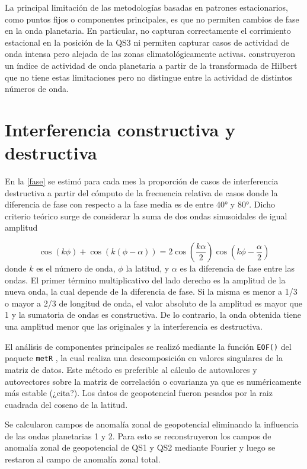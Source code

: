 \documentclass[spanish,a4paper,12pt,oneside]{book}
\begin{document}
La principal limitación de las metodologías basadas en patrones
estacionarios, como puntos fijos o componentes principales, es que no
permiten cambios de fase en la onda planetaria. En particular, no
capturan correctamente el corrimiento estacional en la posición de la
QS3 \autocite{Loon1972} ni permiten capturar casos de actividad de onda
intensa pero alejada de las zonas climatológicamente activas.
\textcite{Irving2015} construyeron un índice de actividad de onda
planetaria a partir de la transformada de Hilbert que no tiene estas
limitaciones pero no distingue entre la actividad de distintos números
de onda.

\section*{Interferencia constructiva y destructiva}

En la \autoref{fase} se estimó para cada mes la proporción de casos de
interferencia destructiva a partir del cómputo de la frecuencia relativa
de casos donde la diferencia de fase con respecto a la fase media es de
entre 40° y 80°. Dicho criterio teórico surge de considerar la suma de
dos ondas sinusoidales de igual amplitud

\[
\cos\left (k\phi \right) + \cos(k(\phi - \alpha)) = 2\cos\left( \frac{k\alpha}{2} \right)\cos\left( k\phi - \frac{\alpha}{2}\right) 
\] donde \(k\) es el número de onda, \(\phi\) la latitud, y \(\alpha\)
es la diferencia de fase entre las ondas. El primer término
multiplicativo del lado derecho es la amplitud de la nueva onda, la cual
depende de la diferencia de fase. Si la misma es menor a 1/3 o mayor a
2/3 de longitud de onda, el valor absoluto de la amplitud es mayor que 1
y la sumatoria de ondas es constructiva. De lo contrario, la onda
obtenida tiene una amplitud menor que las originales y la interferencia
es destructiva.

El análisis de componentes principales se realizó mediante la función
\texttt{EOF()} del paquete \texttt{metR} \autocite{R-metR}, la cual
realiza una descomposición en valores singulares de la matriz de datos.
Este método es preferible al cálculo de autovalores y autovectores sobre
la matriz de correlación o covarianza ya que es numéricamente más
estable (¿cita?). Los datos de geopotencial fueron pesados por la raiz
cuadrada del coseno de la latitud.

Se calcularon campos de anomalía zonal de geopotencial eliminando la
influencia de las ondas planetarias 1 y 2. Para esto se reconstruyeron
los campos de anomalía zonal de geopotencial de QS1 y QS2 mediante
Fourier y luego se restaron al campo de anomalía zonal total.
\end{document}
